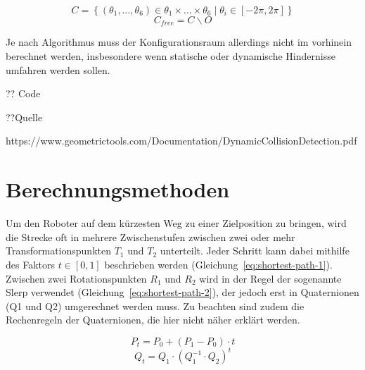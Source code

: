 \begin{equation}
    \mathit{C} = \left\{ \left( \theta_1,\dots,\theta_6 \right) \in \theta_1\times\dots\times\theta_6 \mid \theta_i \in \left[ -2\pi, 2\pi \right]\right\}
    \label{eq:config-1}
\end{equation}
\begin{equation}
    \mathit{C}_{free} = \mathit{C}\backslash\mathit{O}
    \label{eq:config-2}
\end{equation}

Je nach Algorithmus muss der Konfigurationsraum allerdings nicht im vorhinein berechnet werden, insbesondere wenn statische oder dynamische Hindernisse umfahren werden sollen.

?? Code

??Quelle

https://www.geometrictools.com/Documentation/DynamicCollisionDetection.pdf


\section{Berechnungsmethoden}\label{sec:berechnungsmethoden}

Um den Roboter auf dem kürzesten Weg zu einer Zielposition zu bringen, wird die Strecke oft in mehrere Zwischenstufen zwischen zwei oder mehr Transformationspunkten $T_1$ und $T_2$ unterteilt.
Jeder Schritt kann dabei mithilfe des Faktors $t \in \left[0,1\right]$ beschrieben werden (Gleichung~\ref{eq:shortest-path-1}).
Zwischen zwei Rotationspunkten $R_1$ und $R_2$  wird in der Regel der sogenannte Slerp verwendet  (Gleichung~\ref{eq:shortest-path-2}), der jedoch erst in Quaternionen (Q1 und Q2) umgerechnet werden muss.
Zu beachten sind zudem die Rechenregeln der Quaternionen, die hier nicht näher erklärt werden.

\begin{equation}
    P_{t} = P_0 + \left( P_1 - P_0 \right) \cdot t
    \label{eq:shortest-path-1}
\end{equation}
\begin{equation}
    Q_{t} = Q_1 \cdot \left( Q_1^{-1} \cdot Q_2 \right)^t
    \label{eq:shortest-path-2}
\end{equation}


